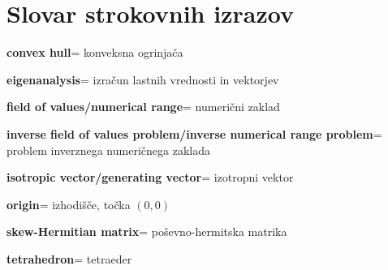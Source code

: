\documentclass[12pt,a4paper]{amsart}
\theoremstyle{definition}
\theoremstyle{plain}
\newcommand{\geslo}[2]{\noindent\textbf{#1}\hspace*{3mm}\hangindent=\parindent\hangafter=1 #2}
\begin{document}
\section*{Slovar strokovnih izrazov}

\geslo{convex hull}{konveksna ogrinjača}

\geslo{eigenanalysis}{izračun lastnih vrednosti in vektorjev}

\geslo{field of values/numerical range}{numerični zaklad}

\geslo{inverse field of values problem/inverse numerical range problem}{problem inverznega numeričnega zaklada}

\geslo{isotropic vector/generating vector}{izotropni vektor}

\geslo{origin}{izhodišče, točka $(0,0)$}

\geslo{skew-Hermitian matrix}{poševno-hermitska matrika}

\geslo{tetrahedron}{tetraeder}




\end{document}
